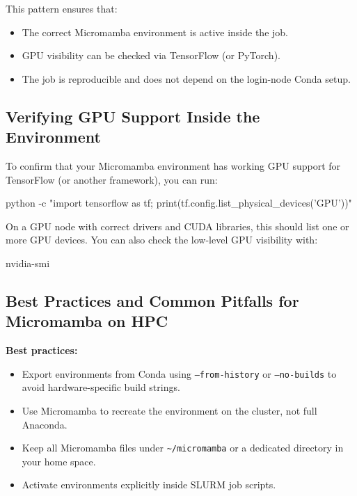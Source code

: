 \documentclass[11pt]{article}
\begin{document}
This pattern ensures that:
\begin{itemize}
  \item The correct Micromamba environment is active inside the job.
  \item GPU visibility can be checked via TensorFlow (or PyTorch).
  \item The job is reproducible and does not depend on the login-node Conda setup.
\end{itemize}

\subsection{Verifying GPU Support Inside the Environment}
\label{subsec:verify-gpu}

To confirm that your Micromamba environment has working GPU support for
TensorFlow (or another framework), you can run:\\

\begin{codeblock}
python -c "import tensorflow as tf; print(tf.config.list_physical_devices('GPU'))"
\end{codeblock}

On a GPU node with correct drivers and CUDA libraries, this should list one or
more GPU devices. You can also check the low-level GPU visibility with:\\
\begin{codeblock}
nvidia-smi
\end{codeblock}

\subsection{Best Practices and Common Pitfalls for Micromamba on HPC}
\label{subsec:micromamba-best-practices}

\textbf{Best practices:}
\begin{itemize}
  \item Export environments from Conda using \texttt{--from-history} or \texttt{--no-builds}
        to avoid hardware-specific build strings.
  \item Use Micromamba to recreate the environment on the cluster, not full Anaconda.
  \item Keep all Micromamba files under \texttt{\~{}/micromamba} or a dedicated directory
        in your home space.
  \item Activate environments explicitly inside SLURM job scripts.
\end{itemize}
\end{document}
